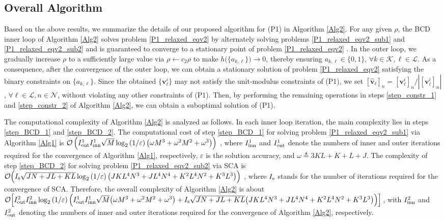 \documentclass[12pt,draftclsnofoot, onecolumn]{IEEEtran}
\theoremstyle{plain}
\begin{document}
\begin{sloppypar}
\subsection{Overall Algorithm}
Based on the above results, we summarize the details of our proposed algorithm for (P1) in Algorithm \ref{Alg2}. For any given $\rho$, the BCD inner loop of Algorithm \ref{Alg2} solves problem \eqref{P1_relaxed_eqv2} by alternately solving problems \eqref{P1_relaxed_eqv2_sub1} and \eqref{P1_relaxed_eqv2_sub2} and is guaranteed to converge to a stationary point of problem \eqref{P1_relaxed_eqv2} \cite{2001_Tseng_BCD}. In the outer loop, we gradually increase $\rho$ to a sufficiently large value via $\rho \leftarrow c_2\rho$ to make $h\big(\{a_{k,\ell}\}\big) \rightarrow 0$, thereby ensuring $a_{k,\ell} \in \{0,1\}$, $\forall k\in\mathcal K, \ell\in\mathcal L$. As a consequence, after the convergence of the outer loop, we can obtain a stationary solution of problem \eqref{P1_relaxed_eqv2} satisfying the binary constraints on $\{a_{k,\ell}\}$. Since the obtained $\{\mathbf v_\ell^i\}$ may not satisfy the unit-modulus constraints of (P1), we set $\left[ \hat{\mathbf v}_\ell\right]_n = \left[\mathbf v_\ell^i\right]_n/\left|\left[ \mathbf v_\ell^i\right]_n\right|$, $\forall \ell\in\mathcal L, n\in\mathcal N$, without violating any other constraints of (P1). Then, by performing the remaining operations in steps \ref{step_constr_1} and \ref{step_constr_2} of Algorithm \ref{Alg2}, we can obtain a suboptimal solution of (P1). 

The computational complexity of Algorithm \ref{Alg2} is analyzed as follows. In each inner loop iteration, the main complexity lies in steps \ref{step_BCD_1} and \ref{step_BCD_2}. The computational cost of step \ref{step_BCD_1} for solving problem \eqref{P1_relaxed_eqv2_sub1} via Algorithm \ref{Alg1} is $\mathcal O\left(I_{\rm out}^1I_{\rm inn}^1\sqrt{M}\log_2\left({1}/{\varepsilon}\right)\big(\omega M^3 + \omega^2 M^2 + \omega^3\big)\right)$ \cite{2010_Imre_SDR_complexity}, where $I_{\rm inn}^1$ and $I_{\rm out}^1$ denote the numbers of inner and outer iterations required for the convergence of Algorithm \ref{Alg1}, respectively, $\varepsilon$ is the solution accuracy, and $\omega \triangleq 3KL + K + L + J$. The complexity of step \ref{step_BCD_2} for solving problem \eqref{P1_relaxed_eqv2_sub2} via SCA is $\mathcal O\Big(I_{\rm s}\sqrt{JN + JL + KL}\log_2\left({1}/{\varepsilon}\right)\big(JKL^4N^3 + JL^4N^4 + K^2L^4N^2 + K^3L^3\big)\Big)$ \cite{2014_K.wang_complexity}, where $I_{\rm s}$ stands for the number of iterations required for the convergence of SCA. Therefore, the overall complexity of Algorithm \ref{Alg2} is about $\mathcal O\Big[I_{\rm out}^2I_{\rm inn}^2\log_2\left({1}/{\varepsilon}\right)\Big(I_{\rm out}^1I_{\rm inn}^1\sqrt{M}\big(\omega M^3 + \omega^2 M^2 + \omega^3\big) + I_{\rm s}\sqrt{JN + JL + KL}\big(JKL^4N^3 + JL^4N^4 + K^2L^4N^2 + K^3L^3\big)\Big)\Big]$, with $I_{\rm inn}^2$ and $I_{\rm out}^2$ denoting the numbers of inner and outer iterations required for the convergence of Algorithm \ref{Alg2}, respectively. 


\end{sloppypar}
\end{document}
